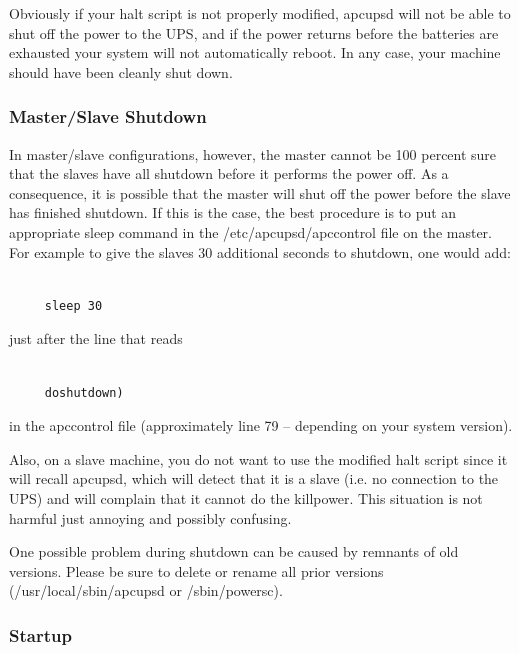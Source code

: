 {{{{{{{{{{{{{{{{{Obviously if your halt script is not properly modified, apcupsd will not be
able to shut off the power to the UPS, and if the power returns before the
batteries are exhausted your system will not automatically reboot. In any
case, your machine should have been cleanly shut down. 

\label{Master_002fSlave-Shutdown-_003c1_003e}

\subsubsection*{Master/Slave Shutdown}

In master/slave configurations, however, the master cannot be 100 percent sure
that the slaves have all shutdown before it performs the power off. As a
consequence, it is possible that the master will shut off the power before the
slave has finished shutdown. If this is the case, the best procedure is to put
an appropriate sleep command in the /etc/apcupsd/apccontrol file on the
master. For example to give the slaves 30 additional seconds to shutdown, one
would add: 

\footnotesize
\begin{verbatim}
     
     sleep 30
\end{verbatim}
\normalsize

just after the line that reads 

\footnotesize
\begin{verbatim}
     
     doshutdown)
\end{verbatim}
\normalsize

in the apccontrol file (approximately line 79 {--} depending on your system
version).  

Also, on a slave machine, you do not want to use the modified halt script
since it will recall apcupsd, which will detect that it is a slave (i.e. no
connection to the UPS) and will complain that it cannot do the killpower. This
situation is not harmful just annoying and possibly confusing.  

One possible problem during shutdown can be caused by remnants of old
versions. Please be sure to delete or rename all prior versions
(/usr/local/sbin/apcupsd or /sbin/powersc). 

\label{Startup}

\subsubsection*{Startup}

}}}}}}}}}}}}}}}}}
